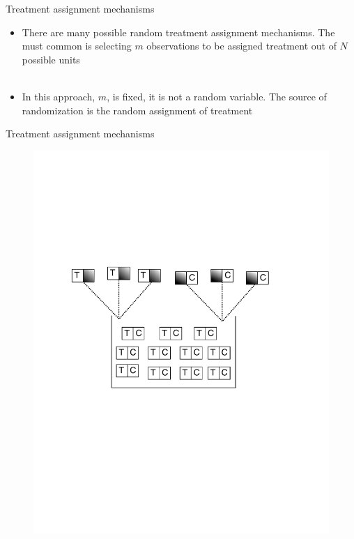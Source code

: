 \documentclass[handout]{beamer}
\theoremstyle{definition}
\begin{document}
\begin{frame}{Treatment assignment mechanisms}
\begin{itemize}
\item There are many possible random treatment assignment mechanisms. The must common is selecting $m$ observations to be assigned treatment out of $N$ possible units \\~\\ 

\item In this approach, $m$, is fixed, it is not a random variable. The source of randomization is the random assignment of treatment
\end{itemize}
\end{frame}

\begin{frame}{Treatment assignment mechanisms}
\begin{figure}
\includegraphics[scale=0.65]{potential_outcomes1.pdf}
\end{figure}
\end{frame}
\end{document}
